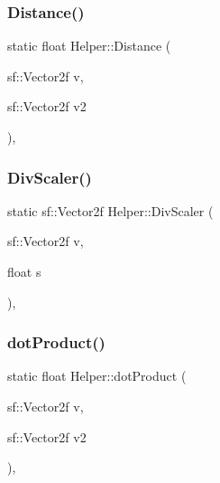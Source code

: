 \mbox{\label{class_helper_aabf497b73c8aedbaf02b0f579ce73704}} 
\subsubsection{\texorpdfstring{Distance()}{Distance()}}
{\footnotesize\ttfamily static float Helper\+::\+Distance (\begin{DoxyParamCaption}\item[{sf\+::\+Vector2f}]{v,  }\item[{sf\+::\+Vector2f}]{v2 }\end{DoxyParamCaption})\hspace{0.3cm}{\ttfamily [inline]}, {\ttfamily [static]}}

\mbox{\label{class_helper_a1a431211d082593425ccfafe077dd5bc}} 
\subsubsection{\texorpdfstring{Div\+Scaler()}{DivScaler()}}
{\footnotesize\ttfamily static sf\+::\+Vector2f Helper\+::\+Div\+Scaler (\begin{DoxyParamCaption}\item[{sf\+::\+Vector2f}]{v,  }\item[{float}]{s }\end{DoxyParamCaption})\hspace{0.3cm}{\ttfamily [inline]}, {\ttfamily [static]}}

\mbox{\label{class_helper_a7a1497494599fe9b5bc68718c812d903}} 
\subsubsection{\texorpdfstring{dot\+Product()}{dotProduct()}}
{\footnotesize\ttfamily static float Helper\+::dot\+Product (\begin{DoxyParamCaption}\item[{sf\+::\+Vector2f}]{v,  }\item[{sf\+::\+Vector2f}]{v2 }\end{DoxyParamCaption})\hspace{0.3cm}{\ttfamily [inline]}, {\ttfamily [static]}}

